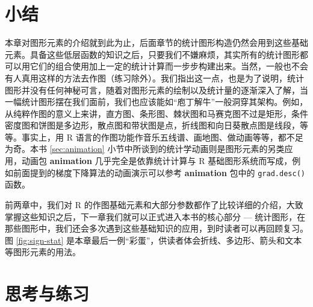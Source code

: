 \documentclass[
  b5paper,
  UTF8,twoside]{book}
\begin{document}
\hypertarget{ux5c0fux7ed3}{%
\section{小结}\label{ux5c0fux7ed3}}

本章对图形元素的介绍就到此为止，后面章节的统计图形构造仍然会用到这些基础元素。具备这些低层函数的知识之后，只要我们不嫌麻烦，其实所有的统计图形都可以用它们的组合使用加上一定的统计计算而一步步构建出来。当然，一般也不会有人真用这样的方法去作图（练习除外）。我们指出这一点，也是为了说明，统计图形并没有任何神秘可言，随着对图形元素的绘制以及统计量的逐渐深入了解，当一幅统计图形摆在我们面前，我们也应该能如``庖丁解牛''一般洞穿其架构。例如，从纯粹作图的意义上来讲，直方图、条形图、棘状图和马赛克图不过是矩形，条件密度图和饼图是多边形，散点图和带状图是点，折线图和向日葵散点图是线段，等等。事实上，用 R 语言的作图功能作音乐五线谱、画地图、做动画等等，都不足为奇。本书 \ref{sec:animation} 小节中所谈到的统计学动画则是图形元素的另类应用，动画包 \textbf{animation} \citep{animation} 几乎完全是依靠统计计算与 R 基础图形系统而写成，例如前面提到的梯度下降算法的动画演示可以参考 \textbf{animation} 包中的 \texttt{grad.desc()} 函数。

前两章中，我们对 R 的作图基础元素和大部分参数都作了比较详细的介绍，大致掌握这些知识之后，下一章我们就可以正式进入本书的核心部分 --- 统计图形，在那些图形中，我们还会多次遇到这些基础知识的应用，到时读者可以再回顾复习。图 \ref{fig:sign-stat} 是本章最后一例``彩蛋''，供读者体会折线、多边形、箭头和文本等图形元素的用法。

\hypertarget{ux601dux8003ux4e0eux7ec3ux4e60-2}{%
\section{思考与练习}\label{ux601dux8003ux4e0eux7ec3ux4e60-2}}
\end{document}
